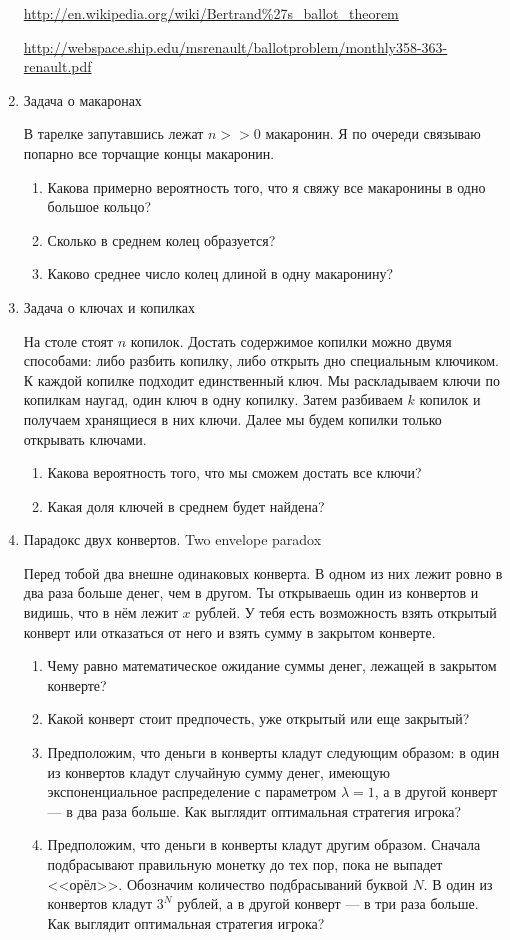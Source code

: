 \documentclass[nobib]{tufte-handout}
\begin{document}
\begin{enumerate}
\url{http://en.wikipedia.org/wiki/Bertrand%27s_ballot_theorem}

\url{http://webspace.ship.edu/msrenault/ballotproblem/monthly358-363-renault.pdf}


\item Задача о макаронах

В тарелке запутавшись лежат $n>>0$ макаронин. Я по очереди связываю попарно все торчащие концы макаронин. 

\begin{enumerate}
\item Какова примерно вероятность того, что я свяжу все макаронины в одно большое кольцо?
\item Сколько в среднем колец образуется?
\item Каково среднее число колец длиной в одну макаронину?
\end{enumerate}

\item Задача о ключах и копилках

На столе стоят $n$ копилок. Достать содержимое копилки можно двумя
способами: либо разбить копилку, либо открыть дно специальным
ключиком. К каждой копилке подходит единственный ключ. Мы раскладываем ключи по
копилкам наугад, один ключ в одну копилку. Затем разбиваем $k$ копилок и получаем хранящиеся в них ключи. Далее мы будем копилки только открывать ключами.
\begin{enumerate}
\item Какова вероятность того, что мы сможем достать все ключи? 
\item Какая доля ключей в среднем будет найдена?
\end{enumerate}


\item Парадокс двух конвертов. Two envelope paradox

Перед тобой два внешне одинаковых конверта. В одном из них лежит ровно в два раза больше денег, чем в другом. Ты открываешь один из конвертов и видишь, что в нём лежит $x$ рублей. У тебя есть возможность взять открытый конверт или отказаться от него и взять сумму в закрытом конверте. 

\begin{enumerate}
\item Чему равно математическое ожидание суммы денег, лежащей в закрытом конверте?
\item Какой конверт стоит предпочесть, уже открытый или еще закрытый?
\item Предположим, что деньги в конверты кладут следующим образом: в один из конвертов кладут случайную сумму денег, имеющую экспоненциальное распределение с параметром $\lambda=1$, а в другой конверт --- в два раза больше. Как выглядит оптимальная стратегия игрока?
\item Предположим, что деньги в конверты кладут другим образом. Сначала подбрасывают правильную монетку до тех пор, пока не выпадет <<орёл>>. Обозначим количество подбрасываний буквой $N$. В один из конвертов кладут $3^N$ рублей, а в другой конверт --- в три раза больше. Как выглядит оптимальная стратегия игрока?
\end{enumerate}



\end{enumerate}
\end{document}
